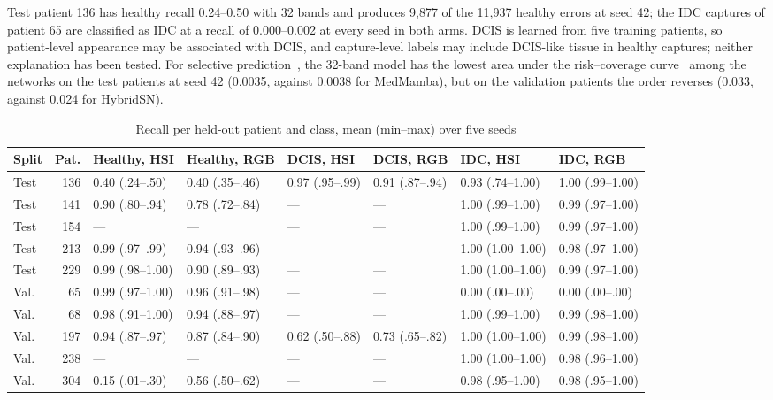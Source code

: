 \documentclass{svproc}
\begin{document}
Test patient 136 has healthy recall 0.24--0.50 with 32 bands and produces 9,877 of the 11,937 healthy errors at seed 42; the IDC captures of patient 65 are classified as IDC at a recall of 0.000--0.002 at every seed in both arms. DCIS is learned from five training patients, so patient-level appearance may be associated with DCIS, and capture-level labels may include DCIS-like tissue in healthy captures; neither explanation has been tested. For selective prediction~\cite{geifman2017,medformer}, the 32-band model has the lowest area under the risk--coverage curve~\cite{aurc} among the networks on the test patients at seed 42 (0.0035, against 0.0038 for MedMamba), but on the validation patients the order reverses (0.033, against 0.024 for HybridSN).

\begin{table}[!htb]
\caption{Recall per held-out patient and class, mean (min--max) over five seeds}
\label{tab:perpatient}
\centering\scriptsize
\setlength{\tabcolsep}{2.4pt}
\begin{tabular}{@{}lrllllll@{}}
\toprule
Split & Pat. & Healthy, HSI & Healthy, RGB & DCIS, HSI & DCIS, RGB & IDC, HSI & IDC, RGB \\
\midrule
Test & 136 & 0.40 {\tiny(.24--.50)} & 0.40 {\tiny(.35--.46)} & 0.97 {\tiny(.95--.99)} & 0.91 {\tiny(.87--.94)} & 0.93 {\tiny(.74--1.00)} & 1.00 {\tiny(.99--1.00)} \\
Test & 141 & 0.90 {\tiny(.80--.94)} & 0.78 {\tiny(.72--.84)} & --- & --- & 1.00 {\tiny(.99--1.00)} & 0.99 {\tiny(.97--1.00)} \\
Test & 154 & --- & --- & --- & --- & 1.00 {\tiny(.99--1.00)} & 0.99 {\tiny(.97--1.00)} \\
Test & 213 & 0.99 {\tiny(.97--.99)} & 0.94 {\tiny(.93--.96)} & --- & --- & 1.00 {\tiny(1.00--1.00)} & 0.98 {\tiny(.97--1.00)} \\
Test & 229 & 0.99 {\tiny(.98--1.00)} & 0.90 {\tiny(.89--.93)} & --- & --- & 1.00 {\tiny(1.00--1.00)} & 0.99 {\tiny(.97--1.00)} \\
Val. & 65 & 0.99 {\tiny(.97--1.00)} & 0.96 {\tiny(.91--.98)} & --- & --- & 0.00 {\tiny(.00--.00)} & 0.00 {\tiny(.00--.00)} \\
Val. & 68 & 0.98 {\tiny(.91--1.00)} & 0.94 {\tiny(.88--.97)} & --- & --- & 1.00 {\tiny(.99--1.00)} & 0.99 {\tiny(.98--1.00)} \\
Val. & 197 & 0.94 {\tiny(.87--.97)} & 0.87 {\tiny(.84--.90)} & 0.62 {\tiny(.50--.88)} & 0.73 {\tiny(.65--.82)} & 1.00 {\tiny(1.00--1.00)} & 0.99 {\tiny(.98--1.00)} \\
Val. & 238 & --- & --- & --- & --- & 1.00 {\tiny(1.00--1.00)} & 0.98 {\tiny(.96--1.00)} \\
Val. & 304 & 0.15 {\tiny(.01--.30)} & 0.56 {\tiny(.50--.62)} & --- & --- & 0.98 {\tiny(.95--1.00)} & 0.98 {\tiny(.95--1.00)} \\
\bottomrule
\end{tabular}
\end{table}
\end{document}
